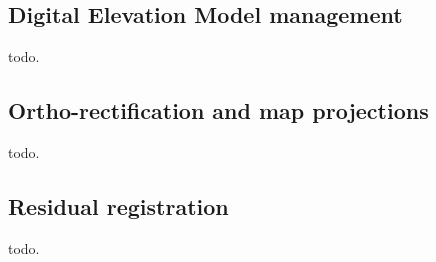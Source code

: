 \subsection{Digital Elevation Model management}\label{ssec:dem}

todo.

\subsection{Ortho-rectification and map projections}\label{ssec:ortho}

todo.

\subsection{Residual registration}\label{ssec:registration}

todo.
